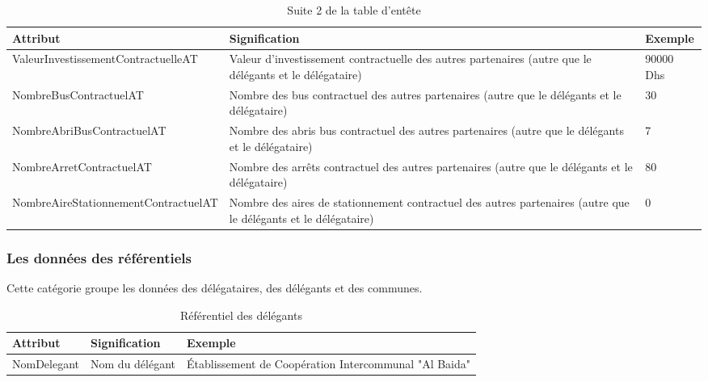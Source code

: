	\begin{table}[H]
		\begin{center}
			\begin{tabularx}{17.5cm}{|p{6cm}|X|p{1.6cm}|}
				\hline
				\textbf{Attribut}                    & \textbf{Signification}                                                                                          & \textbf{Exemple} \\
				\hline
				ValeurInvestissementContractuelleAT  & Valeur d'investissement contractuelle des autres partenaires (autre que le délégants et le délégataire)         & 90000 Dhs        \\
				\hline
				NombreBusContractuelAT               & Nombre des bus contractuel des autres partenaires (autre que le délégants et le délégataire)                    & 30               \\
				\hline
				NombreAbriBusContractuelAT           & Nombre des abris bus contractuel des autres partenaires (autre que le délégants et le délégataire)              & 7                \\
				\hline
				NombreArretContractuelAT             & Nombre des arrêts contractuel des autres partenaires (autre que le délégants et le délégataire)                 & 80               \\
				\hline
				NombreAireStationnementContractuelAT & Nombre des aires de stationnement contractuel des autres partenaires (autre que le délégants et le délégataire) & 0                \\
				\hline
			\end{tabularx}
			\caption{Suite 2 de la table d'entête}
		\end{center}
	\end{table}

	\subsubsection{Les données des référentiels}

	Cette catégorie groupe les données des délégataires, des délégants et des communes.

	\begin{table}[H]
		\begin{center}
			\begin{tabularx}{17.5cm}{|p{3cm}|p{3cm}|X|}
				\hline
				\textbf{Attribut} & \textbf{Signification} & \textbf{Exemple}                                       \\
				\hline
				NomDelegant       & Nom du délégant        & Établissement de Coopération Intercommunal  "Al Baida" \\
				\hline
			\end{tabularx}
			\caption{Référentiel des délégants}
		\end{center}
	\end{table}

